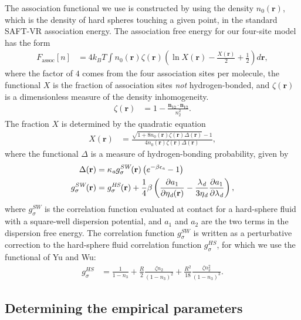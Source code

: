 \documentclass[twocolumn,amsmath,amssymb,prb]{revtex4-1}
\newcommand{\xx}{\textbf{r}}
\begin{document}
The association functional we use is constructed by using the density
$n_0(\xx)$, which is the density of hard spheres touching a given
point, in the standard SAFT-VR association
energy\cite{gil-villegas-1997-SAFT-VR}.
The association free energy for our four-site model has the form
\begin{align}
  F_\text{assoc}[n] &= 4 k_BT \int n_0(\xx) \zeta(\xx)
  \left(\ln X(\xx) - \frac{X(\xx)}{2} + \frac12\right) d\xx,
\end{align}
where the factor of $4$ comes from the four association sites per
molecule, the functional $X$ is the fraction of association sites
\emph{not} hydrogen-bonded, and $\zeta(\xx)$ is a dimensionless
measure of the density inhomogeneity.
\begin{align}
  \zeta(\xx) &= 1 - \frac{\mathbf{n}_{V2}\cdot\mathbf{n}_{V2}}{n_2^2}.
\end{align}
%
The fraction $X$ is determined by the quadratic equation
\begin{align}
  X(\xx) &= \frac{\sqrt{1 + 8n_0(\xx)\zeta(\xx)
      \Delta(\xx)} - 1}
  {4 n_0(\xx)\zeta(\xx)
    \Delta(\xx)},
\end{align}
where the functional $\Delta$ is a measure of hydrogen-bonding
probability, given by
\begin{align}
  \Delta(\xx) &= \kappaassoc g^\textit{SW}_\sigma(\xx)
  \left(e^{-\beta\epsilonassoc} - 1\right) \\
  g^\textit{SW}_\sigma(\xx) &= g^\textit{HS}_\sigma(\xx) +
  \frac{1}{4}\beta\left(\frac{\partial a_1}{\partial \etadisp(\xx)} -
  \frac{\lambdadisp}{3 \etadisp}\frac{\partial a_1}{\partial \lambdadisp}\right)\label{eq:gSW},
\end{align}
where $g^\textit{SW}_\sigma$ is the correlation function evaluated at
contact for a hard-sphere fluid with a square-well dispersion
potential, and $a_1$ and $a_2$ are the two terms in the dispersion
free energy.  The correlation function $g^\textit{SW}_\sigma$ is
written as a perturbative correction to the hard-sphere fluid
correlation function $g^\textit{HS}_\sigma$, for which we use the
functional of Yu and Wu\cite{yu2002fmt-dft-inhomogeneous-associating}:
\begin{align}
  g_\sigma^{HS} &= \frac{1}{1-n_3}
  +\frac{R}{2}\frac{\zeta n_2}{(1-n_3)^2}
  + \frac{R^2}{18}\frac{\zeta n_2^2}{(1-n_3)^3}.
\end{align}

\subsection{Determining the empirical parameters}\label{sec:empirical}
\end{document}

